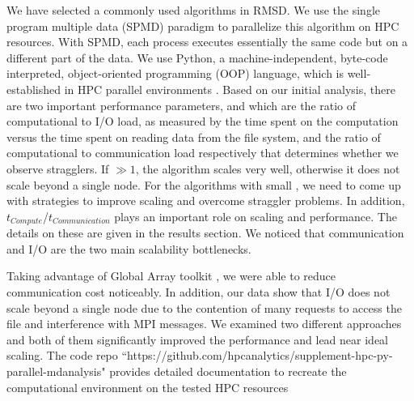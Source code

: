 We have selected a commonly used algorithms in  RMSD.
We use the single program multiple data (SPMD) paradigm to parallelize this algorithm on HPC resources.
With SPMD, each process executes essentially the same code but on a different part of the data. 
We use Python, a machine-independent, byte-code interpreted, object-oriented programming (OOP) language, which is well-established in HPC parallel environments \cite{GAiN}. 
Based on our initial analysis, there are two important performance parameters,  and  which are the ratio of computational to I/O load, as measured by the time spent on the computation versus the time spent on reading data from the file system, and the ratio of computational to communication load respectively that determines whether we observe stragglers.
If   $\gg 1$, the algorithm scales very well, otherwise it does not scale beyond a single node.  
For the algorithms with small , we need to come up with strategies to improve scaling and overcome straggler problems.
In addition, $t_{Compute}$/$t_{Communication}$ plays an important role on scaling and performance.   
The details on these are given in the results section. 
We noticed that communication and I/O are the two main scalability bottlenecks.

Taking advantage of Global Array toolkit \cite{GA, GAiN}, we were able to reduce communication cost noticeably.
In addition, our data show that I/O does not scale beyond a single node due to the contention of many requests to access the file and interference with MPI messages. 
We examined two different approaches and both of them significantly improved the performance and lead near ideal scaling.
The code repo ``https://github.com/hpcanalytics/supplement-hpc-py-parallel-mdanalysis" provides detailed documentation to recreate the computational environment on the tested HPC resources